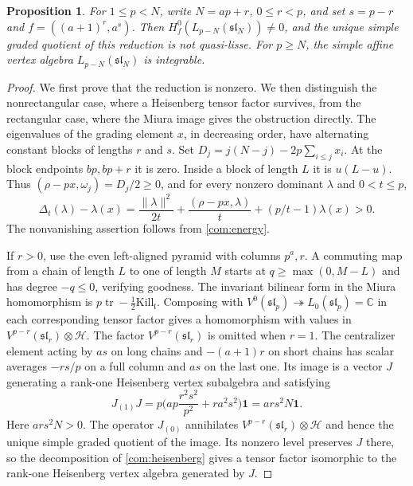 \documentclass[11pt,a4paper]{amsart}
\numberwithin{equation}{section}
\newtheorem{proposition}[theorem]{Proposition}
\theoremstyle{definition}
\theoremstyle{remark}
\newcommand{\C}{\mathbb C}
\newcommand{\lev}{\mathfrak l}
\newcommand{\slg}{\mathfrak{sl}}
\newcommand{\tr}{\operatorname{tr}}
\begin{document}
\begin{proposition}\label{seed:A}
For $1\le p<N$, write $N=ap+r$, $0\le r<p$, and set $s=p-r$ and
$f=((a+1)^r,a^s)$. Then $H_f^0(L_{p-N}(\slg_N))\ne0$, and the unique simple graded
quotient of this reduction is not quasi-lisse. For $p\ge N$, the simple affine vertex algebra $L_{p-N}(\slg_N)$ is
integrable.
\end{proposition}
\begin{proof}
We first prove that the reduction is nonzero. We then distinguish the
nonrectangular case, where a Heisenberg tensor factor survives, from the
rectangular case, where the Miura image gives the obstruction directly.
The eigenvalues of the grading element $x$, in decreasing order, have
alternating constant blocks of lengths $r$ and $s$.
Set $D_j=j(N-j)-2p\sum_{i\le j}x_i$. At the block endpoints
$bp,bp+r$ it is zero. Inside a block of length $L$ it is $u(L-u)$.
Thus $(\rho-px,\omega_j)=D_j/2\ge0$, and for every nonzero dominant
$\lambda$ and $0<t\le p$,
$$
 \Delta_t(\lambda)-\lambda(x)=
 \frac{\|\lambda\|^2}{2t}+\frac{(\rho-px,\lambda)}t
 +(p/t-1)\lambda(x)>0.
$$
The nonvanishing assertion follows from \cref{com:energy}.

If $r>0$, use the even left-aligned pyramid with columns $p^a,r$.
A commuting map from a chain of length $L$ to one of length $M$ starts
at $q\ge\max(0,M-L)$ and has degree $-q\le0$, verifying goodness.
The invariant bilinear form in the Miura homomorphism is
$p\tr-\frac12\mathrm{Kill}_{\lev}$. Composing with
$V^0(\slg_p)\twoheadrightarrow L_0(\slg_p)=\C$ in each corresponding
tensor factor gives a homomorphism with values in $V^{p-r}(\slg_r)\otimes\mathcal H$. The factor
$V^{p-r}(\slg_r)$ is omitted when $r=1$. The centralizer element acting by
$as$ on long chains and $-(a+1)r$ on short chains has scalar averages
$-rs/p$ on a full column and $as$ on the last one. Its image is a vector $J$ generating a rank-one Heisenberg
vertex subalgebra and satisfying
$$
 J_{(1)}J=p\bigg(ap\frac{r^2s^2}{p^2}+ra^2s^2\bigg)\mathbf1
 =ars^2N\mathbf1.
$$
Here $ars^2N>0$.
The operator $J_{(0)}$ annihilates $V^{p-r}(\slg_r)\otimes\mathcal H$
and hence the unique simple graded quotient of the image. Its nonzero level preserves $J$ there, so the
decomposition of \cref{com:heisenberg} gives a tensor factor
isomorphic to the rank-one Heisenberg vertex algebra generated by $J$.


\end{proof}
\end{document}
